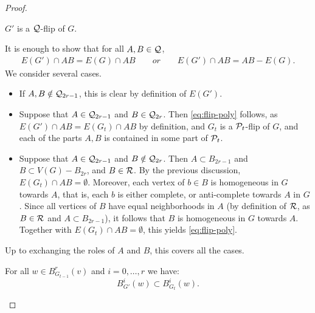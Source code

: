 \begin{proof}
    \begin{claim}\label{cl:k-flip-poly}
        $G'$ is a $\cal Q$-flip of $G$.
    \end{claim}
    \begin{claimproof}
        
        It is enough to show that for all   $A,B\in \cal Q$, 
        \begin{align}
            E(G')\cap AB=E(G)\cap AB\qquad\textit{or}\qquad
            E(G')\cap AB= AB-E(G).\label{eq:flip-poly}    
        \end{align}
        We consider several cases.
    \begin{itemize}
        \item If $A,B\notin \cal Q_{2r-1}$, this is clear by definition of $E(G')$.
        \item Suppose that $A\in\cal Q_{2r-1}$ and $B\in \cal Q_{2r}$.
        Then \eqref{eq:flip-poly} follows, as $E(G')\cap AB=E(G_t)\cap AB$ by definition,
        and $G_t$ is a $\cal P_t$-flip of $G$, and each of the parts $A,B$ is contained in some part of $\cal P_t$.
        \item Suppose that $A\in\cal Q_{2r-1}$ and $B\notin\cal Q_{2r}$. Then 
        $A\subset B_{2r-1}$ and 
        $B\subset V(G)-B_{2r}$, and $B\in\cal R$. By the previous discussion, $E(G_t)\cap AB=\emptyset$. Moreover, each vertex of $b\in B$ is homogeneous in $G$ towards $A$,
        that is, each $b$ is either complete, or anti-complete towards $A$ in $G$.
        Since all vertices of $B$ have equal neighborhoods in $A$
        (by definition of $\cal R$, as $B\in\cal R$ and $A\subset B_{2r-1}$),
        it follows that $B$ is homogeneous in $G$ towards $A$.
    Together with $E(G_t)\cap AB=\emptyset$, this yields \eqref{eq:flip-poly}.
    \end{itemize}
    Up to exchanging the roles of $A$ and $B$, this covers all the cases.
    \end{claimproof}
    
    
    
    
    \begin{claim}\label{cl:balls-poly}
        For all $w\in B^r_{G_{t-1}}(v)$
     and $i=0,\ldots,r$ we have:
        $$B^i_{G'}(w)\subset B^i_{G_t}(w).$$
    \end{claim}
    

\end{proof}
